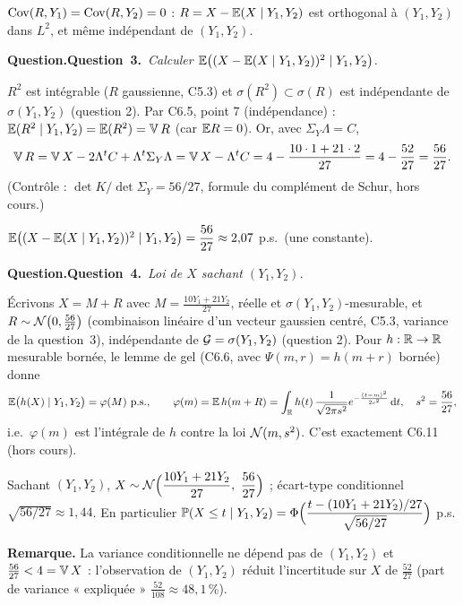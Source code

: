 \documentclass[11pt,a4paper]{article}
\newcommand{\question}[2]{\par\medskip\noindent\textbf{\ifx\relax#1\relax Question.\else Question~#1.\fi}~\textit{#2}\par\smallskip}
\begin{document}
\begin{exo}
\begin{resultat}
$\operatorname{Cov}(R,Y_1)=\operatorname{Cov}(R,Y_2)=0$ : $R=X-\mathbb{E}(X\mid Y_1,Y_2)$ est orthogonal à $(Y_1,Y_2)$ dans $L^2$, et même indépendant de $(Y_1,Y_2)$.
\end{resultat}

\question{3}{Calculer $\mathbb{E}\bigl((X-\mathbb{E}(X\mid Y_1,Y_2))^2\mid Y_1,Y_2\bigr)$.}

$R^2$ est intégrable ($R$ gaussienne, C5.3) et $\sigma(R^2)\subset\sigma(R)$ est indépendante de $\sigma(Y_1,Y_2)$ (question 2). Par C6.5,
point 7 (indépendance) : $\mathbb{E}(R^2\mid Y_1,Y_2)=\mathbb{E}(R^2)=\operatorname{\mathbb{V}} R$ (car $\mathbb{E} R=0$). Or, avec $\Sigma_Y\Lambda=C$,
\[\operatorname{\mathbb{V}} R=\operatorname{\mathbb{V}} X-2\Lambda^tC+\Lambda^t\Sigma_Y\Lambda=\operatorname{\mathbb{V}} X-\Lambda^tC=4-\frac{10\cdot1+21\cdot2}{27}=4-\frac{52}{27}=\frac{56}{27}.\]
(Contrôle : $\det K/\det\Sigma_Y=56/27$, formule du complément de Schur, hors cours.)

\begin{resultat}
$\mathbb{E}\bigl((X-\mathbb{E}(X\mid Y_1,Y_2))^2\mid Y_1,Y_2\bigr)=\dfrac{56}{27}\approx2{,}07$ \quad p.s.\ (une constante).
\end{resultat}

\question{4}{Loi de $X$ sachant $(Y_1,Y_2)$.}

Écrivons $X=M+R$ avec $M=\frac{10Y_1+21Y_2}{27}$, réelle et $\sigma(Y_1,Y_2)$-mesurable, et $R\sim\mathcal{N}\bigl(0,\frac{56}{27}\bigr)$ (combinaison
linéaire d'un vecteur gaussien centré, C5.3, variance de la question~3), indépendante de $\mathcal{G}=\sigma(Y_1,Y_2)$ (question 2). Pour
$h:\mathbb{R}\to\mathbb{R}$ mesurable bornée, le lemme de gel (C6.6, avec $\Psi(m,r)=h(m+r)$ bornée) donne
\[\mathbb{E}\bigl(h(X)\mid Y_1,Y_2\bigr)=\varphi(M)\ \text{p.s.},\qquad \varphi(m)=\mathbb{E}\,h(m+R)=\int_{\mathbb{R}} h(t)\,\frac{1}{\sqrt{2\pi s^2}}e^{-\frac{(t-m)^2}{2s^2}}\,\mathrm{d} t,\quad s^2=\frac{56}{27},\]
i.e.\ $\varphi(m)$ est l'intégrale de $h$ contre la loi $\mathcal{N}(m,s^2)$. C'est exactement C6.11 (hors cours).

\begin{resultat}
Sachant $(Y_1,Y_2)$, $X\sim\Nc\Bigl(\dfrac{10Y_1+21Y_2}{27},\ \dfrac{56}{27}\Bigr)$ ; écart-type conditionnel $\sqrt{56/27}\approx1{,}44$.
En particulier $\mathbb{P}(X\le t\mid Y_1,Y_2)=\Phi\Bigl(\dfrac{t-(10Y_1+21Y_2)/27}{\sqrt{56/27}}\Bigr)$ p.s.
\end{resultat}
\textbf{Remarque.} La variance conditionnelle ne dépend pas de $(Y_1,Y_2)$ et $\frac{56}{27}<4=\operatorname{\mathbb{V}} X$ : l'observation de $(Y_1,Y_2)$ réduit
l'incertitude sur $X$ de $\frac{52}{27}$ (part de variance « expliquée » $\frac{52}{108}\approx48{,}1\,\%$).
\end{exo}
\end{document}
